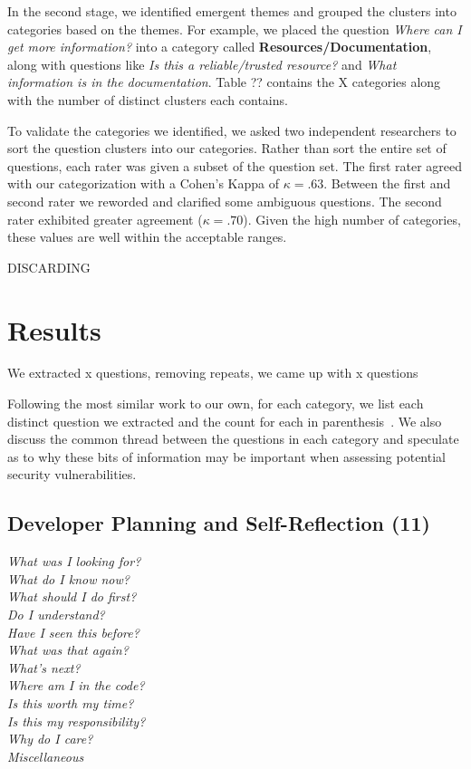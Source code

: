 \documentclass[conference]{IEEEtran}
\begin{document}

In the second stage, we identified emergent themes and grouped the clusters into categories based on the themes. 
For example, we placed the question \textit{Where can I get more information?} into a category called \textbf{Resources/Documentation}, along with questions like \textit{Is this a reliable/trusted resource?} and \textit{What information is in the documentation}. 
Table ?? contains the X categories along with the number of distinct clusters each contains. 

To validate the categories we identified, we asked two independent researchers to sort the question clusters into our categories. 
Rather than sort the entire set of questions, each rater was given a subset of the question set. 
The first rater agreed with our categorization with a Cohen's Kappa of $\kappa = .63$. 
Between the first and second rater we reworded and clarified some ambiguous questions. The second rater exhibited greater agreement ($\kappa = .70$). 
Given the high number of categories, these values are well within the acceptable ranges.

DISCARDING

\section{Results}
\label{sec:results}
We extracted x questions, removing repeats, we came up with x questions

Following the most similar work to our own, for each category, we list each distinct question we extracted and the count for each in parenthesis~\cite{latoza2010hard}. We also discuss the common thread between the questions in each category and speculate as to why these bits of information may be important when assessing potential security vulnerabilities.

\noindent\subsection{\textbf{Developer Planning and Self-Reflection (11)}} 

\noindent\emph{What was I looking for?} \\
\emph{What do I know now?} \\
\emph{What should I do first?} \\
\emph{Do I understand?} \\
\emph{Have I seen this before?} \\
\emph{What was that again?} \\
\emph{What's next?} \\
\emph{Where am I in the code?} \\
\emph{Is this worth my time?} \\
\emph{Is this my responsibility?} \\
\emph{Why do I care?} \\
\emph{Miscellaneous} \\
\end{document}
